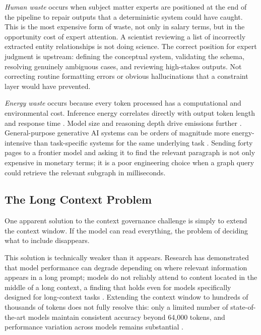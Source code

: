\documentclass[man,12pt,donotrepeattitle]{apa7}
\begin{document}
\textit{Human waste} occurs when subject matter experts are positioned at
the end of the pipeline to repair outputs that a deterministic system could
have caught. This is the most expensive form of waste, not only in salary
terms, but in the opportunity cost of expert attention. A scientist
reviewing a list of incorrectly extracted entity relationships is not doing
science. The correct position for expert judgment is upstream: defining the
conceptual system, validating the schema, resolving genuinely ambiguous
cases, and reviewing high-stakes outputs. Not correcting routine formatting
errors or obvious hallucinations that a constraint layer would have
prevented.

\textit{Energy waste} occurs because every token processed has a
computational and environmental cost. Inference energy correlates directly
with output token length and response time \parencite{poddar2025}. Model
size and reasoning depth drive emissions further \parencite{dauner2025}.
General-purpose generative AI systems can be orders of magnitude more
energy-intensive than task-specific systems for the same underlying task
\parencite{luccioni2024}. Sending forty pages to a frontier model and asking
it to find the relevant paragraph is not only expensive in monetary terms;
it is a poor engineering choice when a graph query could retrieve the
relevant subgraph in milliseconds.

\subsection{The Long Context Problem}

One apparent solution to the context governance challenge is simply to
extend the context window. If the model can read everything, the problem of
deciding what to include disappears.

This solution is technically weaker than it appears. Research has
demonstrated that model performance can degrade depending on where relevant
information appears in a long prompt; models do not reliably attend to
content located in the middle of a long context, a finding that holds even
for models specifically designed for long-context tasks \parencite{liu2024}.
Extending the context window to hundreds of thousands of tokens does not
fully resolve this: only a limited number of state-of-the-art models
maintain consistent accuracy beyond 64,000 tokens, and performance variation
across models remains substantial \parencite{leng2024}.
\end{document}
